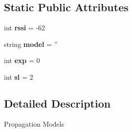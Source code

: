 \subsection*{Static Public Attributes}
\begin{DoxyCompactItemize}
\item 
\hypertarget{classmininet_1_1wifiPropagationModels_1_1propagationModel___a0793e80d3e06a8d03bf856ad34d7ba71}{int {\bfseries rssi} = -\/62}\label{classmininet_1_1wifiPropagationModels_1_1propagationModel___a0793e80d3e06a8d03bf856ad34d7ba71}

\item 
\hypertarget{classmininet_1_1wifiPropagationModels_1_1propagationModel___a9a1266ab336f0f56e16960efc090dc6a}{string {\bfseries model} = ''}\label{classmininet_1_1wifiPropagationModels_1_1propagationModel___a9a1266ab336f0f56e16960efc090dc6a}

\item 
\hypertarget{classmininet_1_1wifiPropagationModels_1_1propagationModel___a9e272bfc2880eb20ffdf2f37f2f00e0d}{int {\bfseries exp} = 0}\label{classmininet_1_1wifiPropagationModels_1_1propagationModel___a9e272bfc2880eb20ffdf2f37f2f00e0d}

\item 
\hypertarget{classmininet_1_1wifiPropagationModels_1_1propagationModel___ab307987b99039365f8b1e0aff45f3516}{int {\bfseries sl} = 2}\label{classmininet_1_1wifiPropagationModels_1_1propagationModel___ab307987b99039365f8b1e0aff45f3516}

\end{DoxyCompactItemize}


\subsection{Detailed Description}
\begin{DoxyVerb}Propagation Models \end{DoxyVerb}
 

